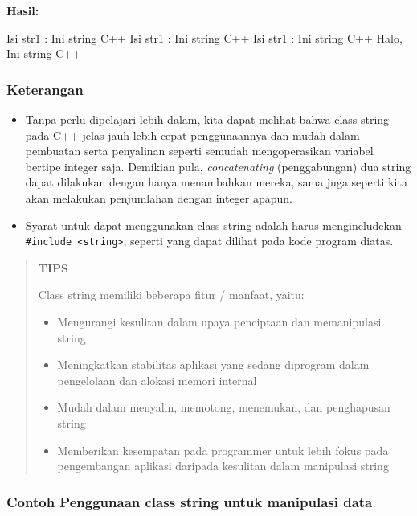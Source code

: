 \textbf{Hasil:}

\begin{lcverbatim}
Isi str1 : Ini string C++
Isi str1 : Ini string C++
Isi str1 : Ini string C++
Halo, Ini string C++
\end{lcverbatim}

\subsubsection*{Keterangan}

\begin{itemize}

\item
  Tanpa perlu dipelajari lebih dalam, kita dapat melihat bahwa class
  string pada C++ jelas jauh lebih cepat penggunaannya dan mudah dalam
  pembuatan serta penyalinan seperti semudah mengoperasikan variabel
  bertipe integer saja. Demikian pula, \emph{concatenating}
  (penggabungan) dua string dapat dilakukan dengan hanya menambahkan
  mereka, sama juga seperti kita akan melakukan penjumlahan dengan
  integer apapun.
\item
  Syarat untuk dapat menggunakan class string adalah harus
  mengincludekan \texttt{\#include\ \textless{}string\textgreater{}},
  seperti yang dapat dilihat pada kode program diatas.
\end{itemize}
\begin{quotation}
{\LARGE {}}  \textbf{TIPS} 
 
 Class
 string memiliki beberapa fitur / manfaat, yaitu: 
\begin{itemize}
\item Mengurangi kesulitan dalam upaya penciptaan dan
memanipulasi string
\item Meningkatkan stabilitas aplikasi
yang sedang diprogram dalam pengelolaan dan alokasi memori internal
\item Mudah dalam menyalin, memotong, menemukan, dan
penghapusan string
\item Memberikan kesempatan pada
programmer untuk lebih fokus pada pengembangan aplikasi daripada
kesulitan dalam manipulasi string
\end{itemize} 
 
\end{quotation}


\subsubsection*{Contoh  Penggunaan class string untuk manipulasi data}

